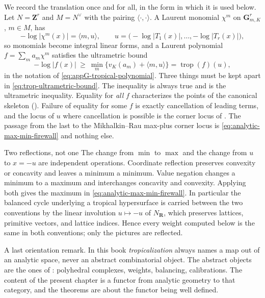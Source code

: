 We record the translation once and for all, in the form in which it is used
below. Let $N=\mathbf Z^r$ and $M=N^\vee$ with the pairing
$\langle\cdot,\cdot\rangle$. A Laurent monomial $\chi^m$ on
$\mathbf G_{m,K}^r$, $m\in M$, has
\begin{equation}
\label{eq:trop-monomial-affine}
 -\log|\chi^m(x)|=\langle m,u\rangle,
 \qquad u=\bigl(-\log|T_1(x)|,\ldots,-\log|T_r(x)|\bigr),
\end{equation}
so monomials become integral linear forms, and a Laurent polynomial
$f=\sum_ma_m\chi^m$ satisfies the ultrametric bound
\begin{equation}
\label{eq:trop-ultrametric-bound}
 -\log|f(x)|\ \ge\ \min_m\bigl\{v_K(a_m)+\langle m,u\rangle\bigr\}
 =\operatorname{trop}(f)(u),
\end{equation}
in the notation of \eqref{eq:appG-tropical-polynomial}. Three things must be
kept apart in \eqref{eq:trop-ultrametric-bound}. The inequality is always
true and is the ultrametric inequality. Equality for \emph{all} $f$
characterizes the points of the canonical skeleton
(). Failure of equality for some $f$ is
exactly cancellation of leading terms, and the locus of $u$ where
cancellation is possible is the corner locus of
. The passage from the last to the
Mikhalkin--Rau max-plus corner locus is \eqref{eq:analytic-max-min-firewall}
and nothing else.

\begin{warning}{Two reflections, not one}
The change from $\min$ to $\max$ and the change from $u$ to $x=-u$ are
independent operations. Coordinate reflection preserves convexity or
concavity and leaves a minimum a minimum. Value negation changes a minimum
to a maximum and interchanges concavity and convexity. Applying both gives
the maximum in \eqref{eq:analytic-max-min-firewall}. In particular the balanced
cycle underlying a tropical hypersurface is carried between the two
conventions by the linear involution $u\mapsto-u$ of $N_{\mathbf R}$, which
preserves lattices, primitive vectors, and lattice indices. Hence every
weight computed below is the same in both conventions; only the pictures are
reflected.
\end{warning}

A last orientation remark. In this book \emph{tropicalization} always names
a map out of an analytic space, never an abstract combinatorial object. The
abstract objects are the ones of : polyhedral
complexes, weights, balancing, calibrations. The content of the present
chapter is a functor from analytic geometry to that category, and the
theorems are about the functor being well defined.

